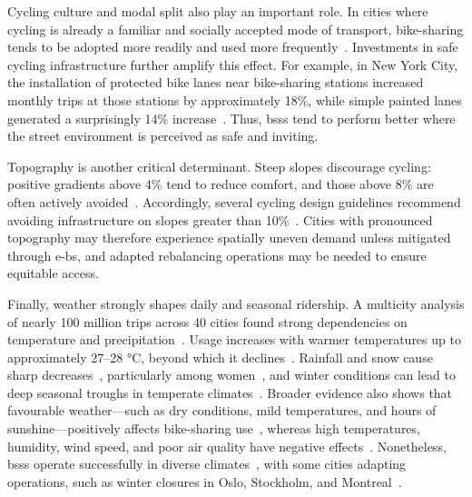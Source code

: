         Cycling culture and modal split also play an important role. In cities where cycling is already a familiar and socially accepted mode of transport, bike-sharing tends to be adopted more readily and used more frequently~\cite{Fishman2016, Willberg2021}. Investments in safe cycling infrastructure further amplify this effect. For example, in New York City, the installation of protected bike lanes near bike-sharing stations increased monthly trips at those stations by approximately 18\%, while simple painted lanes generated a surprisingly 14\% increase~\cite{Moran2025}. Thus, \acp{bss} tend to perform better where the street environment is perceived as safe and inviting.


        Topography is another critical determinant. Steep slopes discourage cycling: positive gradients above 4\% tend to reduce comfort, and those above 8\% are often actively avoided~\cite{Midgley2011}. Accordingly, several cycling design guidelines recommend avoiding infrastructure on slopes greater than 10\%~\cite{AASHTO1999bicycle, CycleHighways2025, CROW2006}. Cities with pronounced topography may therefore experience spatially uneven demand unless mitigated through \acp{e-b}, and adapted rebalancing operations may be needed to ensure equitable access.

        Finally, weather strongly shapes daily and seasonal ridership. A multicity analysis of nearly 100 million trips across 40 cities found strong dependencies on temperature and precipitation~\cite{Bean2021}. Usage increases with warmer temperatures up to approximately 27–28 °C, beyond which it declines~\cite{Julio2022}. Rainfall and snow cause sharp decreases~\cite{Bean2021, Wang2021, Julio2022}, particularly among women~\cite{Nahal2018}, and winter conditions can lead to deep seasonal troughs in temperate climates~\cite{Julio2022}. Broader evidence also shows that favourable weather—such as dry conditions, mild temperatures, and hours of sunshine—positively affects bike-sharing use~\cite{Corcoran2014, FaghihImani2014, Gebhart2014, Caulfield2017, Campbell2016}, whereas high temperatures, humidity, wind speed, and poor air quality have negative effects~\cite{Campbell2016, Corcoran2014, Caulfield2017}. Nonetheless, \acp{bss} operate successfully in diverse climates~\cite{OBIS2011, Yanocha2018}, with some cities adapting operations, such as winter closures in Oslo, Stockholm, and Montreal~\cite{OBIS2011}.

